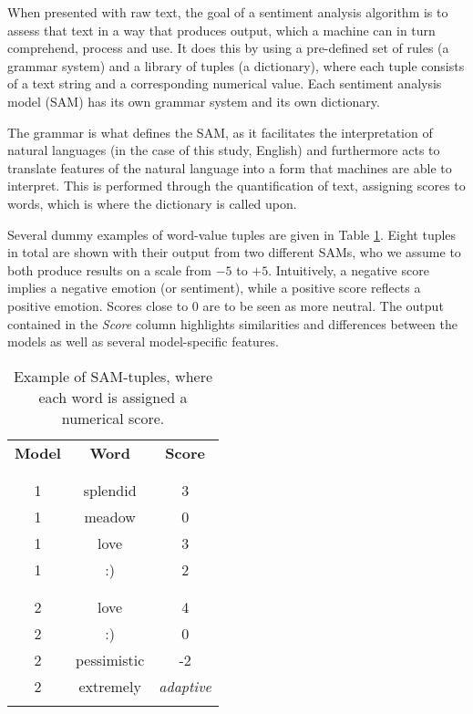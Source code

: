 \documentclass{article}
\begin{document}
When presented with raw text, the goal of a sentiment analysis algorithm is to assess that text in a way that produces output, which a machine can in turn comprehend, process and use. It does this by using a pre-defined set of rules (a grammar system) and a library of tuples (a dictionary), where each tuple consists of a text string and a corresponding numerical value. Each sentiment analysis model (SAM) has its own grammar system and its own dictionary.

The grammar is what defines the SAM, as it facilitates the interpretation of natural languages (in the case of this study, English) and furthermore acts to translate features of the natural language into a form that machines are able to interpret. This is performed through the quantification of text, assigning scores to words, which is where the dictionary is called upon.

Several dummy examples of word-value tuples are given in Table \ref{tab:example-tuples}. Eight tuples in total are shown with their output from two different SAMs, who we assume to both produce results on a scale from $-5$ to $+5$. Intuitively, a negative score implies a negative emotion (or sentiment), while a positive score reflects a positive emotion. Scores close to $0$ are to be seen as more neutral. The output contained in the \emph{Score} column highlights similarities and differences between the models as well as several model-specific features.

\vspace{3mm}

\begin{table}[htb]
\centering
\begin{tabular}{ccc}
\textbf{Model} & \textbf{Word} & \textbf{Score}\\
 &  & \\
\hline
 &  & \\
1 & splendid & 3\\
1 & meadow & 0\\
1 & love & 3\\
1 & :) & 2\\
 &  & \\
\hline
 &  & \\
2 & love & 4\\
2 & :) & 0\\
2 & pessimistic & -2\\
2 & extremely & \emph{adaptive}\\
 &  & \\
\end{tabular}\caption{\label{tab:example-tuples}Example of SAM-tuples, where each word is assigned a numerical score.}

\end{table}
\end{document}
